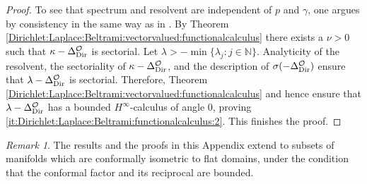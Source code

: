 \documentclass[12pt,a4paper, reqno]{amsart}
\theoremstyle{plain}
\theoremstyle{definition}
\theoremstyle{remark}
\newtheorem{remark}[theorem]{Remark}
\numberwithin{equation}{section}
\newcommand{\1}{\mathbbm{1}}
\newcommand{\N}{\ensuremath{\mathbb{N}}}
\newcommand{\calO}{\ensuremath{\mathcal{O}}}
\newcommand{\Dir}{\textup{Dir}}
\begin{document}
\begin{proof}
    To see that spectrum and resolvent are independent of $p$ and $\gamma$, one argues by consistency in the same way as in \cite[Corollary 1.6.2]{Davies_1989_HeatKernels_spectral_theory}.
    By Theorem \ref{Dirichlet:Laplace:Beltrami:vectorvalued:functionalcalculus} there exists a $\nu>0 $ such that $\kappa-\Delta^\calO_\Dir$ is sectorial. Let $\lambda >-\min\{\lambda_j\colon j\in\N\}$. 
    Analyticity of the resolvent, the sectoriality of $\kappa-\Delta^\calO_\Dir$, and the description of $\sigma(-\Delta^\calO_\Dir) $ ensure that $\lambda-\Delta^\calO_\Dir$ is sectorial. Therefore, Theorem \ref{Dirichlet:Laplace:Beltrami:vectorvalued:functionalcalculus} and \cite[Corollary 5.5.5]{Haase2006_FunctionalCalculus} hence ensure that $\lambda-\Delta^\calO_\Dir$ has a bounded $H^\infty$-calculus of angle $0$, proving \ref{it:Dirichlet:Laplace:Beltrami:functionalcalculus:2}. This finishes the proof.
 \end{proof}
 \begin{remark}
     The results and the proofs in this Appendix extend to  subsets of manifolds which are conformally isometric to flat domains, under the condition that the conformal factor and its reciprocal are bounded. 
 \end{remark}


\end{document}

